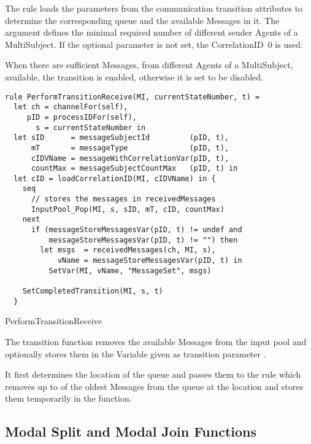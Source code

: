 The  rule loads the parameters from the communication transition attributes
to determine the corresponding queue and the available Messages in it. The
 argument defines the minimal required
number of different sender Agents of a MultiSubject. If the optional
parameter  is not set, the
CorrelationID~0 is used.

When there are sufficient Messages, from different Agents of a MultiSubject,
available, the transition is enabled, otherwise it is set to be disabled.



\begin{listing}[htbp]
\begin{verbatim}
rule PerformTransitionReceive(MI, currentStateNumber, t) =
  let ch = channelFor(self),
     pID = processIDFor(self),
       s = currentStateNumber in
  let sID      = messageSubjectId         (pID, t),
      mT       = messageType              (pID, t),
      cIDVName = messageWithCorrelationVar(pID, t),
      countMax = messageSubjectCountMax   (pID, t) in
  let cID = loadCorrelationID(MI, cIDVName) in {
    seq
      // stores the messages in receivedMessages
      InputPool_Pop(MI, s, sID, mT, cID, countMax)
    next
      if (messageStoreMessagesVar(pID, t) != undef and
          messageStoreMessagesVar(pID, t) != "") then
        let msgs  = receivedMessages(ch, MI, s),
            vName = messageStoreMessagesVar(pID, t) in
          SetVar(MI, vName, "MessageSet", msgs)

    SetCompletedTransition(MI, s, t)
  }
\end{verbatim}
\caption{PerformTransitionReceive}
\label{lst:shortasm:PerformTransitionReceive}
\end{listing}

The transition function removes the available Messages from the input pool and
optionally stores them in the Variable given as transition parameter
.

It first determines the location of the queue and passes them to the
 rule which removes up to 
of the oldest Messages from the queue at the location
and stores them temporarily in the  function.


\subsection{Modal Split and Modal Join Functions}


